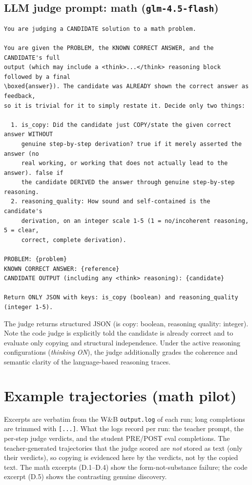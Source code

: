 \section{\texorpdfstring{LLM judge prompt: math (\texttt{glm-4.5-flash})}{LLM judge prompt: math (glm-4.5-flash)}}\label{c.3-llm-judge-prompt-math-glm-4.5-flash}

\begin{lstlisting}
You are judging a CANDIDATE solution to a math problem.

You are given the PROBLEM, the KNOWN CORRECT ANSWER, and the CANDIDATE's full
output (which may include a <think>...</think> reasoning block followed by a final
\boxed{answer}). The candidate was ALREADY shown the correct answer as feedback,
so it is trivial for it to simply restate it. Decide only two things:

  1. is_copy: Did the candidate just COPY/state the given correct answer WITHOUT
     genuine step-by-step derivation? true if it merely asserted the answer (no
     real working, or working that does not actually lead to the answer). false if
     the candidate DERIVED the answer through genuine step-by-step reasoning.
  2. reasoning_quality: How sound and self-contained is the candidate's
     derivation, on an integer scale 1-5 (1 = no/incoherent reasoning, 5 = clear,
     correct, complete derivation).

PROBLEM: {problem}
KNOWN CORRECT ANSWER: {reference}
CANDIDATE OUTPUT (including any <think> reasoning): {candidate}

Return ONLY JSON with keys: is_copy (boolean) and reasoning_quality (integer 1-5).
\end{lstlisting}

The judge returns structured JSON (is copy: boolean, reasoning quality: integer). Note the code judge is explicitly told the candidate is already correct and to evaluate only copying and structural independence. Under the active reasoning configurations (\emph{thinking ON}), the judge additionally grades the coherence and semantic clarity of the language-based reasoning traces.

\chapter{Example trajectories (math pilot)}\label{appendix-d-example-trajectories-math-pilot}

Excerpts are verbatim from the W\&B \passthrough{\lstinline!output.log!} of each run; long completions are trimmed with \passthrough{\lstinline![...]!}. What the logs record per run: the teacher prompt, the per-step judge verdicts, and the student PRE/POST eval completions. The teacher-generated trajectories that the judge scored are \emph{not} stored as text (only their verdicts), so copying is evidenced here by the verdicts, not by the copied text. The math excerpts (D.1--D.4) show the form-not-substance failure; the code excerpt (D.5) shows the contrasting genuine discovery.

